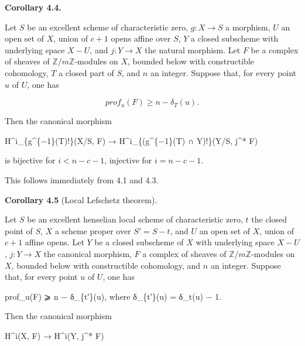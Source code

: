 \documentclass[
  11pt,
  a4paper,
]{book}
\newenvironment{Shaded}{}{}
\newcommand{\NormalTok}[1]{#1}
\begin{document}
\textbf{Corollary 4.4.}

Let \(S\) be an excellent scheme of characteristic zero, \(g : X \to S\)
a morphism, \(U\) an open set of \(X\), union of \(c +
1\) opens affine over \(S\), \(Y\) a closed subscheme with underlying
space \(X - U\), and \(j : Y \to X\) the natural morphism. Let \(F\) be
a complex of sheaves of \(\mathbb{Z}/m\mathbb{Z}\)-modules on \(X\),
bounded below with constructible cohomology, \(T\) a closed part of
\(S\), and \(n\) an integer. Suppose that, for every point \(u\) of
\(U\), one has

\[ prof_{u}(F) \geqslant n - \delta_{T}(u). \]

Then the canonical morphism

\begin{Shaded}
\begin{Highlighting}[]
\NormalTok{H\^{}i\_\{g\^{}\{−1\}(T)!\}(X/S, F) → H\^{}i\_\{(g\^{}\{−1\}(T) ∩ Y)!\}(Y/S, j\^{}* F)}
\end{Highlighting}
\end{Shaded}

is bijective for \(i < n - c - 1\), injective for \(i = n - c - 1\).

This follows immediately from 4.1 and 4.3.

\textbf{Corollary 4.5} (Local Lefschetz theorem).

Let \(S\) be an excellent henselian local scheme of characteristic zero,
\(t\) the closed point of \(S\), \(X\) a scheme proper over
\(S' = S - {t}\), and \(U\) an open set of \(X\), union of \(c + 1\)
affine opens. Let \(Y\) be a closed subscheme of \(X\) with underlying
space \(X - U\), \(j : Y \to X\) the canonical morphism, \(F\) a complex
of sheaves of \(\mathbb{Z}/m\mathbb{Z}\)-modules on \(X\), bounded below
with constructible cohomology, and \(n\) an integer. Suppose that, for
every point \(u\) of \(U\), one has

\begin{Shaded}
\begin{Highlighting}[]
\NormalTok{prof\_u(F) ⩾ n − δ\_\{t′\}(u), where δ\_\{t′\}(u) = δ\_t(u) − 1.}
\end{Highlighting}
\end{Shaded}

Then the canonical morphism

\begin{Shaded}
\begin{Highlighting}[]
\NormalTok{H\^{}i(X, F) → H\^{}i(Y, j\^{}* F)}
\end{Highlighting}
\end{Shaded}
\end{document}
